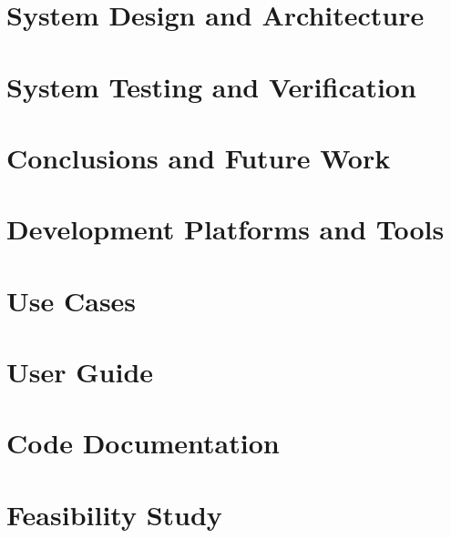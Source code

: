 \documentclass[a4paper,12pt]{article}
\begin{document}
\newpage

\section{System Design and Architecture}


\newpage

\section{System Testing and Verification}


\newpage

\section{Conclusions and Future Work}


\newpage


\medskip




\newpage


\appendix

\section{Development Platforms and Tools}


\section{Use Cases}


\section{User Guide}


\section{Code Documentation}


\section{Feasibility Study}


\end{document}
